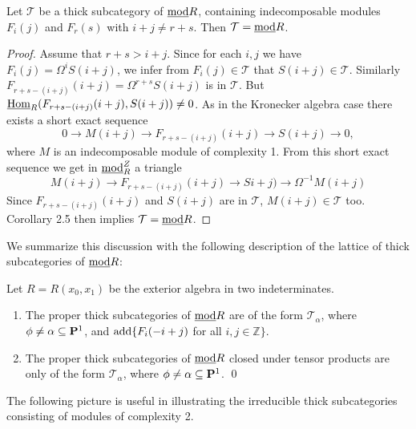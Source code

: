 \documentclass[10pt]{amsart}
\begin{document}
\begin{lemma} Let $\mathcal T$ be a thick subcategory of  $\underline{\operatorname{mod}} R$, containing indecomposable
 modules $F_i(j)$ and $F_r(s)$ with $i+j\neq r+s$. Then $\mathcal T =\underline{\operatorname{mod}} R$.
\end{lemma}
\begin{proof} Assume that $r+s>i+j$. Since for each $i,j$ we have $F_i(j)=\Omega^iS(i+j)$,  
we infer  from $F_i(j) \in \mathcal T$ that $S(i+j) \in \mathcal T$.  
Similarly $F_{r+s-(i+j)}(i+j)=\Omega^{r+s}S(i+j)$ is in $\mathcal T$. 
But $\underline{\operatorname{Hom}}_R(F_{r+s-(i+j)}(i+j), S(i+j))\neq 0$. As in the Kronecker 
algebra case there exists a short exact sequence
$$ 0\to M(i+j)\to F_{r+s-(i+j)}(i+j) \to S(i+j) \to 0,$$
\noindent where $M$ is an indecomposable module  of complexity 1. From this 
short exact sequence we get in  $\underline{\operatorname{mod}}^Z_R$ a
triangle 
$$M(i+j) \to F_{r+s-(i+j)}(i+j) \to Si+j) \to \Omega^{-1}M(i+j)$$ 
\noindent Since $F_{r+s-(i+j)}(i+j)$ and $S(i+j)$ are in $\mathcal T$, $M(i+j)\in\mathcal T$ too. Corollary 2.5 then 
implies $\mathcal T=\underline{\operatorname{mod}} R$.
\end{proof}
\noindent We summarize this discussion with the following description 
of the lattice of thick subcategories of $\underline{\operatorname{mod}} R$:

\begin{thm} Let $R=R(x_0,x_1)$ be the exterior algebra in two indeterminates.
\
 \begin{enumerate}
\item The proper thick subcategories of $\underline{\operatorname{mod}} R$ 
are of the form $\mathcal T_{\alpha}$, where $\phi\ne {\alpha\subseteq {\bf P}^1}$,
 and $\operatorname{add}\{F_i(-i+j)$ for all $i,j\in\mathbb Z\}$.
 \item The proper thick subcategories of $\underline{\operatorname{mod}} R$ closed under tensor products  
are only of the form $\mathcal T_{\alpha}$, where $\phi\ne {\alpha\subseteq {\bf P}^1}$. \qed
\end{enumerate}
\end{thm}
\noindent The following picture is useful in illustrating the irreducible thick subcategories consisting of modules of complexity 2.
\end{document}
